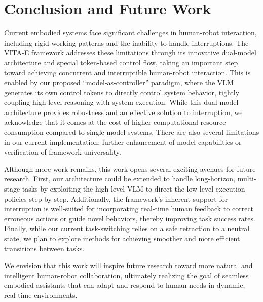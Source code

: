 \vspace{-1em}
\section{Conclusion and Future Work}
\label{sec:conclusion}

Current embodied systems face significant challenges in human-robot interaction, including rigid working patterns and the inability to handle interruptions. The VITA-E framework addresses these limitations through its innovative dual-model architecture and special token-based control flow, taking an important step toward achieving concurrent and interruptible human-robot interaction. This is enabled by our proposed ``model-as-controller'' paradigm, where the VLM generates its own control tokens to directly control system behavior, tightly coupling high-level reasoning with system execution. While this dual-model architecture provides robustness and an effective solution to interruption, we acknowledge that it comes at the cost of higher computational resource consumption compared to single-model systems. There are also several limitations in our current implementation: further enhancement of model capabilities or verification of framework universality.

Although more work remains, this work opens several exciting avenues for future research. First, our architecture could be extended to handle long-horizon, multi-stage tasks by exploiting the high-level VLM to direct the low-level execution policies step-by-step. Additionally, the framework's inherent support for interruption is well-suited for incorporating real-time human feedback to correct erroneous actions or guide novel behaviors, thereby improving task success rates. Finally, while our current task-switching relies on a safe retraction to a neutral state, we plan to explore methods for achieving smoother and more efficient transitions between tasks.

We envision that this work will inspire future research toward more natural and intelligent human-robot collaboration, ultimately realizing the goal of seamless embodied assistants that can adapt and respond to human needs in dynamic, real-time environments.
